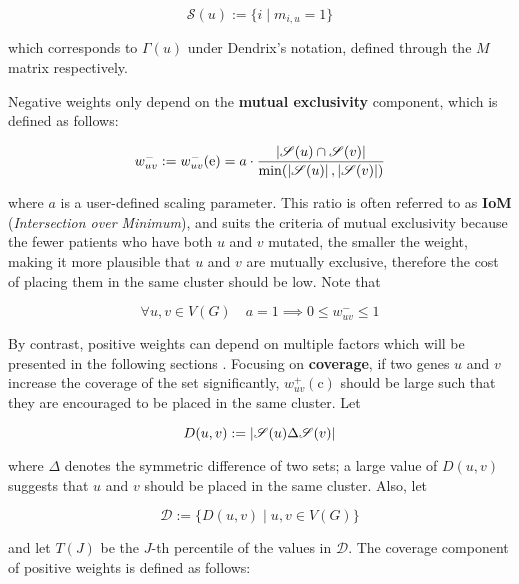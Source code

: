 \begin{equation}
    \mathscr{S}(u) := \{i \mid m_{i, u} = 1\}
\end{equation}

which corresponds to $\Gamma(u)$ under Dendrix's notation, defined through the $M$ matrix respectively.

Negative weights only depend on the \textbf{mutual exclusivity} component, which is defined as follows:

\begin{equation}
    w_{uv}^- := w_{uv}^-(\mathrm e) = a \cdot \dfrac{\left|\mathscr{S}(u) \cap \mathscr{S}(v)\right|}{\min(\left|\mathscr{S}(u)\right|, \left|\mathscr{S}(v)\right|)}
\end{equation}

where $a$ is a user-defined scaling parameter. This ratio is often referred to as \textbf{IoM} (\textit{Intersection over Minimum}), and suits the criteria of mutual exclusivity because the fewer patients who have both $u$ and $v$ mutated, the smaller the weight, making it more plausible that $u$ and $v$ are mutually exclusive, therefore the cost of placing them in the same cluster should be low. Note that

\begin{equation}\label{neg_weight_constraint}
    \forall u, v \in V(G) \quad a = 1 \implies 0 \le w_{uv}^- \le 1
\end{equation}

By contrast, positive weights can depend on multiple factors which will be presented in the following sections . Focusing on \textbf{coverage}, if two genes $u$ and $v$ increase the coverage of the set significantly, $w_{uv}^+(\mathrm c)$ should be large such that they are encouraged to be placed in the same cluster. Let

\begin{equation}
    D(u, v) := \left|\mathscr{S}(u) \Delta \mathscr{S}(v)\right|
\end{equation}

where $\Delta$ denotes the symmetric difference of two sets; a large value of $D(u, v)$ suggests that $u$ and $v$ should be placed in the same cluster. Also, let

\begin{equation}
    \mathscr{D} := \{D(u, v) \mid u, v \in V(G)\}
\end{equation}

and let $T(J)$ be the $J$-th percentile of the values in $\mathscr{D}$. The coverage component of positive weights is defined as follows:

